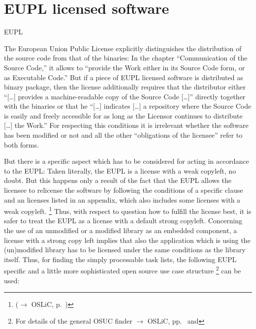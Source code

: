 \section{EUPL licensed software}
\begin{license}{EUPL} %

The European Union Public License explicitly distinguishes the distribution of
the source code from that of the binaries: In the chapter \enquote{Communication
of the Source Code,} it allows to \enquote{provide the Work either in its Source
Code form, or as Executable Code.} But if a piece of EUPL licensed
software is distributed as binary package, then the license additionally
requires that the distributor either \enquote{[\ldots] provides a
machine-readable copy of the Source Code [\ldots]} directly together with the
binaries or that he \enquote{[\ldots] indicates [\ldots] a
repository where the Source Code is easily and freely accessible for as long as
the Licensor continues to distribute [\ldots] the Work.} For
respecting this conditions it is irrelevant whether the software has been 
modified or not and all the other \enquote{obligations of the licensee} refer
to both forms.

But there is a specific aspect which has to be considered for acting in
accordance to the EUPL: Taken literally, the EUPL is a license with a weak
copyleft, no doubt. But this happens only a result of the fact that the EUPL
allows the licensee to relicense the software by following the conditions of a
specific clause and an licenses listed in an appendix, which also includes some
licenses with a weak copyleft.%
  \footnote{($\rightarrow$ OSLiC, p.\ )} 
Thus, with respect to question how to fulfill the license best, it is safer to
treat the EUPL as a license with a default strong copyleft. Concerning the use
of an unmodified or a modified library as an embedded component, a license with
a strong copy left implies that also the application which is using the
(un)modified library has to be licensed under the same conditions as the library 
itself. Thus, for finding the simply processable task lists, the following EUPL
specific and a little more sophisticated open source use case structure%
  \footnote{For details of the general OSUC finder $\rightarrow$ OSLiC,
    pp.\ \pageref{OsucTokens} and \pageref{OsucDefinitionTree}} 
can be used:


\end{license}
